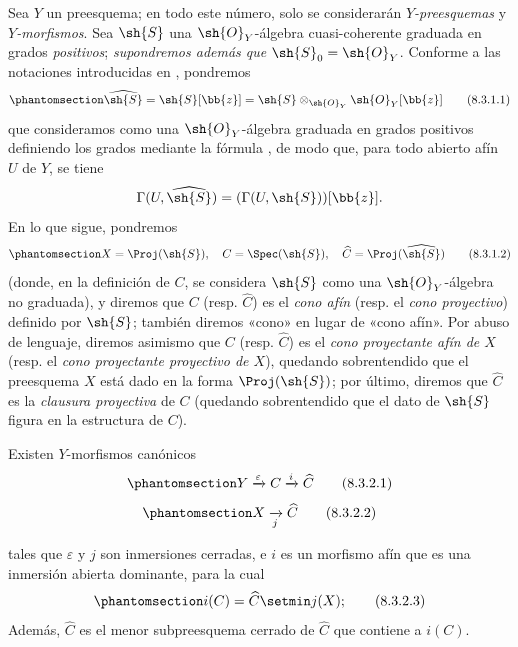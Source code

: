 \documentclass[oneside,10pt]{amsart}
\newcommand{\oldpage}[2][]{\marginnote{\normalfont\footnotesize\textbf{#1}~|~#2}\ignorespaces}
\let\EGAOriginalLabel\label
\renewcommand{\label}[1]{\phantomsection\EGAOriginalLabel{#1}}
\begin{document}
\begin{env}[8.3.1]
\label{II.8.3.1}
Sea $Y$ un preesquema;
en todo este número, solo se considerarán \emph{$Y$-preesquemas} y \emph{$Y$-morfismos}.
Sea $\sh{S}$ una $\sh{O}_Y$-álgebra cuasi-coherente graduada en grados \emph{positivos};
\emph{supondremos además que $\sh{S}_0=\sh{O}_Y$}.
Conforme a las notaciones introducidas en , pondremos
\[
\label{II.8.3.1.1}
  \widehat{\sh{S}} = \sh{S}[\bb{z}] = \sh{S} \otimes_{\sh{O}_Y} \sh{O}_Y[\bb{z}]
\tag{8.3.1.1}
\]
que consideramos como una $\sh{O}_Y$-álgebra graduada en grados positivos definiendo los grados mediante la fórmula , de modo que, para todo abierto afín $U$ de $Y$, se tiene
\[
  \Gamma(U,\widehat{\sh{S}}) = (\Gamma(U,\sh{S}))[\bb{z}].
\]
En lo que sigue, pondremos
\[
\label{II.8.3.1.2}
  X = \Proj(\sh{S}),
  \quad
  C = \Spec(\sh{S}),
  \quad
  \widehat{C} = \Proj(\widehat{\sh{S}})
\tag{8.3.1.2}
\]
(donde, en la definición de $C$, se considera $\sh{S}$ como una $\sh{O}_Y$-álgebra no graduada), y diremos que $C$ (resp. $\widehat{C}$) es el \emph{cono afín} (resp. el \emph{cono proyectivo}) definido por $\sh{S}$;
también diremos «cono» en lugar de «cono afín».
Por abuso de lenguaje, diremos asimismo que $C$ (resp. $\widehat{C}$) es el \emph{cono proyectante afín de $X$} (resp. el \emph{cono proyectante proyectivo de $X$}), quedando sobrentendido que el preesquema $X$ está dado en la forma $\Proj(\sh{S})$;
por último, diremos que $\widehat{C}$ es la \emph{clausura proyectiva} de $C$ (quedando sobrentendido que el dato de $\sh{S}$ figura en la estructura de $C$).
\end{env}
\begin{proposition}[8.3.2]
\label{II.8.3.2}
Existen $Y$-morfismos canónicos
\[
\label{II.8.3.2.1}
  Y \xrightarrow{\varepsilon} C \xrightarrow{i} \widehat{C}
\tag{8.3.2.1}
\]
\[
\label{II.8.3.2.2}
  X \xrightarrow[j]{} \widehat{C}
\tag{8.3.2.2}
\]

\oldpage[II]{163}
tales que $\varepsilon$ y $j$ son inmersiones cerradas, e $i$ es un morfismo afín que es una inmersión abierta dominante, para la cual
\[
\label{II.8.3.2.3}
  i(C) = \widehat{C}\setmin j(X);
\tag{8.3.2.3}
\]
Además, $\widehat{C}$ es el menor subpreesquema cerrado de $\widehat{C}$ que contiene a $i(C)$.
\end{proposition}
\end{document}
